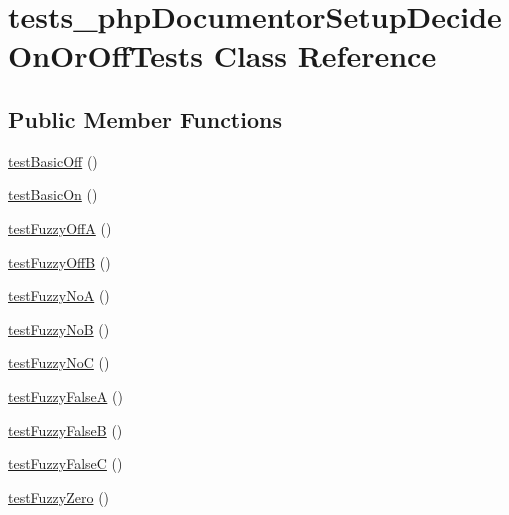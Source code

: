 \hypertarget{classtests__php_documentor_setup_decide_on_or_off_tests}{\section{tests\-\_\-php\-Documentor\-Setup\-Decide\-On\-Or\-Off\-Tests \-Class \-Reference}
\label{classtests__php_documentor_setup_decide_on_or_off_tests}
}
\subsection*{\-Public \-Member \-Functions}
\begin{DoxyCompactItemize}
\item 
\hyperlink{classtests__php_documentor_setup_decide_on_or_off_tests_a29e2c838f8bb806528a4f54a646efa5a}{test\-Basic\-Off} ()
\item 
\hyperlink{classtests__php_documentor_setup_decide_on_or_off_tests_a5e841d24dbbf706da434b44256940da8}{test\-Basic\-On} ()
\item 
\hyperlink{classtests__php_documentor_setup_decide_on_or_off_tests_add070795af9a01a5731d008dde596760}{test\-Fuzzy\-Off\-A} ()
\item 
\hyperlink{classtests__php_documentor_setup_decide_on_or_off_tests_a32fa04692c3d54ef2b12ae03313f9009}{test\-Fuzzy\-Off\-B} ()
\item 
\hyperlink{classtests__php_documentor_setup_decide_on_or_off_tests_a4bc122bc499d73f7f1879a64cc6dc0c8}{test\-Fuzzy\-No\-A} ()
\item 
\hyperlink{classtests__php_documentor_setup_decide_on_or_off_tests_a14aacace9a2a31abb2f4b2545554c592}{test\-Fuzzy\-No\-B} ()
\item 
\hyperlink{classtests__php_documentor_setup_decide_on_or_off_tests_a8a08988c574521206c29abe6092ed727}{test\-Fuzzy\-No\-C} ()
\item 
\hyperlink{classtests__php_documentor_setup_decide_on_or_off_tests_acbd48e40bdb08db9a94fc222fa7ec868}{test\-Fuzzy\-False\-A} ()
\item 
\hyperlink{classtests__php_documentor_setup_decide_on_or_off_tests_a881bee4fb764a712d1796c64507bf13d}{test\-Fuzzy\-False\-B} ()
\item 
\hyperlink{classtests__php_documentor_setup_decide_on_or_off_tests_a2f8c021d0221a4f3b38851acb2a31f6b}{test\-Fuzzy\-False\-C} ()
\item 
\hyperlink{classtests__php_documentor_setup_decide_on_or_off_tests_a82e177328db9cd3c361891b7fa4e3065}{test\-Fuzzy\-Zero} ()

\end{DoxyCompactItemize}
